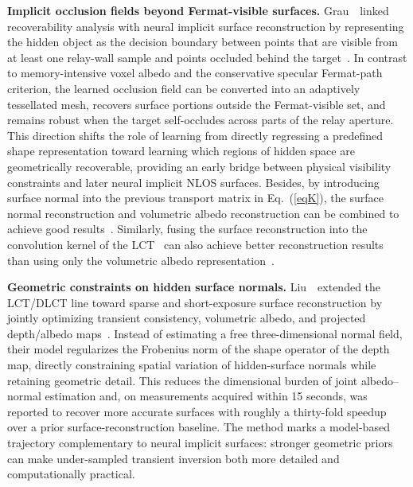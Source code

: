 \vspace{0.8mm}
\noindent \textbf{Implicit occlusion fields beyond Fermat-visible surfaces.}
Grau~\etal~linked recoverability analysis with neural implicit surface reconstruction by representing the hidden object as the decision boundary between points that are visible from at least one relay-wall sample and points occluded behind the target~\cite{grauOcclusionFields2022}. In contrast to memory-intensive voxel albedo and the conservative specular Fermat-path criterion, the learned occlusion field can be converted into an adaptively tessellated mesh, recovers surface portions outside the Fermat-visible set, and remains robust when the target self-occludes across parts of the relay aperture. This direction shifts the role of learning from directly regressing a predefined shape representation toward learning which regions of hidden space are geometrically recoverable, providing an early bridge between physical visibility constraints and later neural implicit NLOS surfaces.
Besides, by introducing surface normal into the previous transport matrix in Eq.~(\ref{eqK}), the surface normal reconstruction and volumetric albedo reconstruction can be combined to achieve good results~\cite{heideNonlineofsightImagingPartial2017}. 
Similarly, fusing the surface reconstruction into the convolution kernel of the LCT~\cite{otooleConfocalNonlineofsightImaging2018} can also achieve better reconstruction results than using only the volumetric albedo representation~\cite{Young:2020:dlct}.

\vspace{0.8mm}
\noindent \textbf{Geometric constraints on hidden surface normals.}
Liu~\etal~extended the LCT/DLCT line toward sparse and short-exposure surface reconstruction by jointly optimizing transient consistency, volumetric albedo, and projected depth/albedo maps~\cite{liuGeometricConstrainedNLOS2025}. Instead of estimating a free three-dimensional normal field, their model regularizes the Frobenius norm of the shape operator of the depth map, directly constraining spatial variation of hidden-surface normals while retaining geometric detail. This reduces the dimensional burden of joint albedo--normal estimation and, on measurements acquired within 15 seconds, was reported to recover more accurate surfaces with roughly a thirty-fold speedup over a prior surface-reconstruction baseline. The method marks a model-based trajectory complementary to neural implicit surfaces: stronger geometric priors can make under-sampled transient inversion both more detailed and computationally practical.

